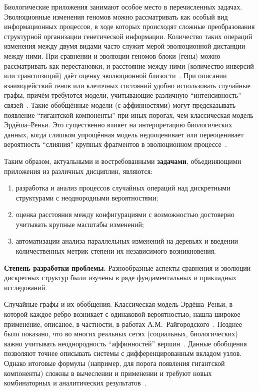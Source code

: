 Биологические приложения занимают особое место в перечисленных задачах.  
Эволюционные изменения геномов можно рассматривать как особый вид информационных процессов, в ходе которых происходят сложные преобразования структурной организации генетической информации. 
Количество таких операций изменения между двумя видами часто служит мерой эволюционной дистанции между ними. 
При сравнении и эволюции геномов блоки (гены) можно рассматривать как перестановки, и расстояние между ними (количество инверсий или транспозиций) даёт оценку эволюционной близости~\cite{yancopoulos2005,braga2010}.  
При описании взаимодействий генов или клеточных состояний удобно использовать случайные графы, причём требуются модели, учитывающие различную ``интенсивность'' связей~\cite{Barabsi2004}. 
Такие обобщённые модели (с аффинностями) могут предсказывать появление ``гигантской компоненты'' при иных порогах, чем классическая модель Эрдёша--Реньи. 
Это существенно влияет на интерпретацию биологических данных, когда слишком упрощённая модель недооценивает или переоценивает вероятность ``слияния'' крупных фрагментов в эволюционном процессе~\cite{tannier2016}.  

Таким образом, актуальными и востребованными \textbf{задачами}, объединяющими приложения из различных дисциплин, являются:  
\begin{enumerate}
    \item разработка и анализ процессов случайных операций над дискретными структурами с неоднородными вероятностями;  
    \item оценка расстояния между конфигурациями с возможностью достоверно учитывать крупные масштабы изменений;  
    \item автоматизации анализа параллельных изменений на деревьях и введении количественных метрик степени их независимого возникновения. 
\end{enumerate}

\textbf{Степень разработки проблемы.}  
Разнообразные аспекты сравнения и эволюции дискретных структур были изучены в ряде фундаментальных и прикладных исследований.  

Случайные графы и их обобщения. 
Классическая модель Эрдёша--Реньи, в которой каждое ребро возникает с одинаковой вероятностью, нашла широкое применение, описаное, в частности, в работах А.М.~Райгородского~\cite{райгородский2010модели,райгородский2022модели}.  
Позднее было показано, что во многих реальных сетях (социальных, биологических) важно учитывать неоднородность ``аффинностей'' вершин~\cite{tannier2016}.
Данные обобщения позволяют точнее описывать системы с дифференцированным вкладом узлов.
Однако итоговые формулы (например, для порога появления гигантской компоненты) сложны в вычеслении и применении и требуют новых комбинаторных и аналитических результатов~\cite{tannier2016}.  

